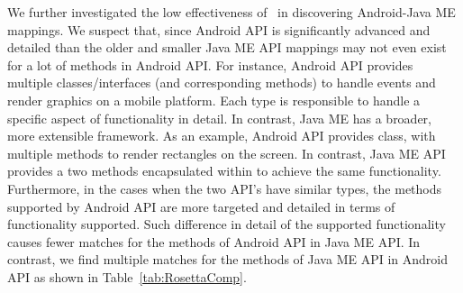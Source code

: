 We further investigated the low effectiveness of \tool\ in discovering Android-Java ME mappings.
We suspect that, since Android API is significantly advanced and detailed than the older and smaller Java ME API mappings may not even exist for a lot of methods in Android API.
For instance, Android API provides multiple classes/interfaces (and corresponding methods) to handle events and render graphics on a mobile platform.
Each type is responsible to handle a specific aspect of functionality in detail.
In contrast, Java ME has a broader, more extensible framework. 
As an example, Android API provides  class, with multiple methods to render rectangles on the screen. 
In contrast, Java ME API provides a two methods encapsulated within  to achieve the same functionality.
Furthermore, in the cases when the two API's have similar types, the methods supported by Android API are more targeted and detailed in terms of functionality supported.
Such difference in detail of the supported functionality causes fewer matches for the methods of Android API in Java ME API. 
In contrast, we find multiple matches for the methods of Java ME API in Android API as shown in Table~\ref{tab:RosettaComp}.


